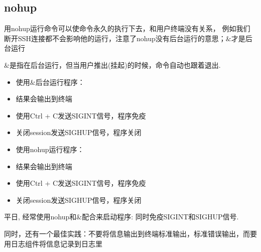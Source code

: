 \subsection{nohup}
用nohup运行命令可以使命令永久的执行下去，和用户终端没有关系，
例如我们断开SSH连接都不会影响他的运行，注意了nohup没有后台运行的意思；$\&$才是后台运行 \par
$\&$是指在后台运行，但当用户推出(挂起)的时候，命令自动也跟着退出. 

\begin{itemize}
    \item 使用$\&$后台运行程序：
    \item 结果会输出到终端
    \item 使用Ctrl + C发送SIGINT信号，程序免疫
    \item 关闭session发送SIGHUP信号，程序关闭
\end{itemize}
\begin{itemize}
    \item 使用nohup运行程序：
    \item 结果会输出到终端
    \item 使用Ctrl + C发送SIGINT信号，程序免疫
    \item 关闭session发送SIGHUP信号，程序关闭
\end{itemize}
平日, 经常使用nohup和$\&$配合来启动程序: 同时免疫SIGINT和SIGHUP信号.\par
同时，还有一个最佳实践：不要将信息输出到终端标准输出，标准错误输出，而要用日志组件将信息记录到日志里

